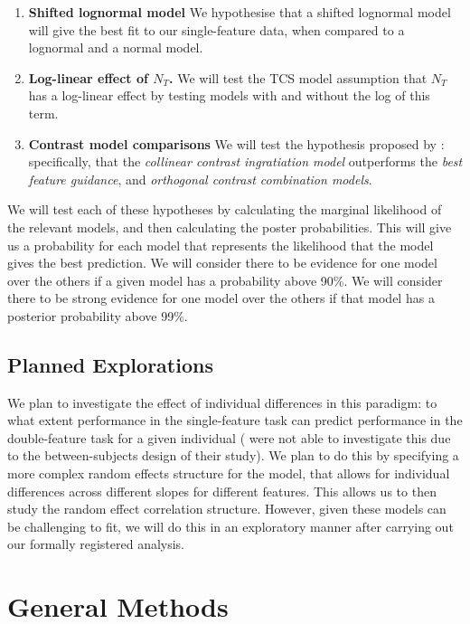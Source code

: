 \documentclass[smallextended, natbib]{svjour3}       %
\begin{document}
\begin{enumerate}
\item \textbf{Shifted lognormal model} We hypothesise that a shifted lognormal model will give the best fit to our single-feature data, when compared to a lognormal and a normal model. \\
\item \textbf{Log-linear effect of $N_T$.} We will test the TCS model assumption that $N_T$ has a log-linear effect by testing models with and without the log of this term.\\ 
\item \textbf{Contrast model comparisons} We will test the hypothesis proposed by \citep{buetti2019predicting}: specifically, that the \textit{collinear contrast ingratiation model} outperforms the \textit{best feature guidance}, and \textit{orthogonal contrast combination models}.\\
\end{enumerate}

We will test each of these hypotheses by calculating the marginal likelihood of the relevant models, and then calculating the poster probabilities. This will give us a probability for each model that represents the likelihood that the model gives the best prediction. We will consider there to be evidence for one model over the others if a given model has a probability above 90\%. We will consider there to be strong evidence for one model over the others if that model has a posterior probability above 99\%.

\subsection{Planned Explorations}

We plan to investigate the effect of individual differences in this paradigm: to what extent performance in the single-feature task can predict performance in the double-feature task for a given individual (\cite{buetti2019predicting} were not able to investigate this due to the between-subjects design of their study). We plan to do this by specifying a more complex random effects structure for the model, that allows for individual differences across different slopes for different features. This allows us to then study the random effect correlation structure.  However, given these models can be challenging to fit, we will do this in an exploratory manner after carrying out our formally registered analysis.

\section{General Methods}
\end{document}
